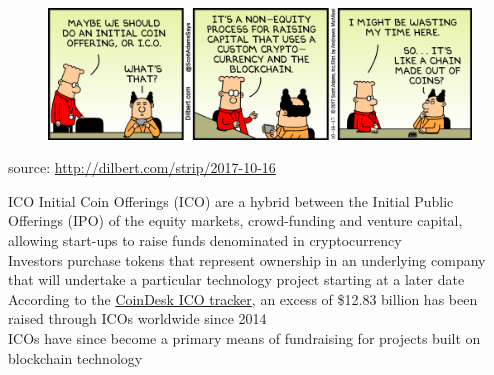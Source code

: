 \documentclass[10pt]{beamer}
\begin{document}
\begin{frame}
	\begin{figure}[]
		\centering
		\includegraphics  [scale=0.07]{Images/dilbert-ico}
	\end{figure}
	\begin{scriptsize}
		source: \href{http://dilbert.com/strip/2017-10-16}{http://dilbert.com/strip/2017-10-16}
	\end{scriptsize}
\end{frame}


\begin{frame}{ICO}
	Initial Coin Offerings (ICO) are a hybrid between the Initial Public Offerings (IPO) of the equity markets, crowd-funding and venture capital, allowing start-ups to raise funds denominated in cryptocurrency\\ \vspace{3mm}
	Investors purchase tokens that represent ownership in an underlying company that will undertake a particular technology project starting at a later date \\ \vspace{3mm}
	According to the \href{https://www.coindesk.com/ico-tracker/}{CoinDesk ICO tracker}, an excess of \$12.83 billion has been raised through ICOs worldwide since 2014 \\ \vspace{3mm}
	ICOs have since become a primary means of fundraising for projects built on blockchain technology
\end{frame}

\end{document}
